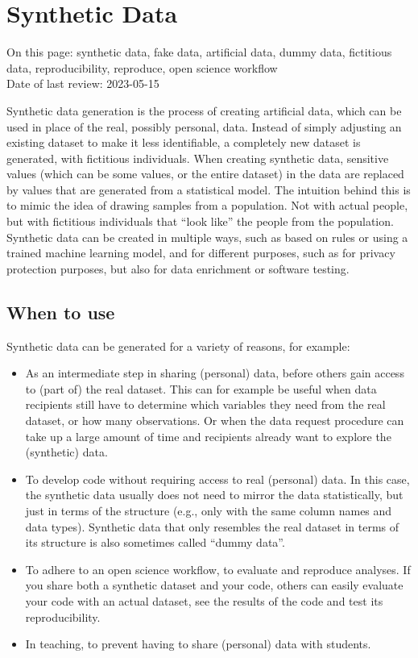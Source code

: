\documentclass[
]{book}
\providecommand{\tightlist}{%
  \setlength{\itemsep}{0pt}\setlength{\parskip}{0pt}}
\begin{document}
\hypertarget{synthetic-data}{%
\section{Synthetic Data}\label{synthetic-data}}

On this page: synthetic data, fake data, artificial data, dummy data, fictitious
data, reproducibility, reproduce, open science workflow\\
Date of last review: 2023-05-15

Synthetic data generation is the process of creating artificial data, which can
be used in place of the real, possibly personal, data. Instead of simply
adjusting an existing dataset to make it less identifiable, a completely new
dataset is generated, with fictitious individuals. When creating synthetic data,
sensitive values (which can be some values, or the entire dataset) in the data
are replaced by values that are generated from a statistical model. The
intuition behind this is to mimic the idea of drawing samples from a population.
Not with actual people, but with fictitious individuals that ``look like'' the
people from the population. Synthetic data can be created in multiple ways,
such as based on rules or using a trained machine learning model, and for
different purposes, such as for privacy protection purposes, but also for data
enrichment or software testing.

\hypertarget{synthetic-data-when}{%
\subsection{When to use}\label{synthetic-data-when}}

Synthetic data can be generated for a variety of reasons, for example:

\begin{itemize}
\tightlist
\item
  As an intermediate step in sharing (personal) data, before others gain access
  to (part of) the real dataset. This can for example be useful when data
  recipients still have to determine which variables they need from the real
  dataset, or how many observations. Or when the data request procedure can take
  up a large amount of time and recipients already want to explore the (synthetic)
  data.
\item
  To develop code without requiring access to real (personal) data. In this
  case, the synthetic data usually does not need to mirror the data statistically,
  but just in terms of the structure (e.g., only with the same column names and
  data types). Synthetic data that only resembles the real dataset in terms of
  its structure is also sometimes called ``dummy data''.
\item
  To adhere to an open science workflow, to evaluate and reproduce analyses. If
  you share both a synthetic dataset and your code, others can easily evaluate
  your code with an actual dataset, see the results of the code and test its
  reproducibility.
\item
  In teaching, to prevent having to share (personal) data with students.
\end{itemize}
\end{document}
